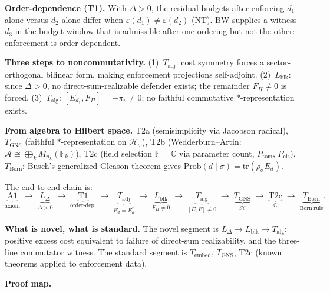 \documentclass[11pt]{article}
\theoremstyle{remark}
\begin{document}
\medskip
\noindent\textbf{Order-dependence (T1).}  With $\Delta > 0$, the residual budgets after enforcing $d_1$ alone versus $d_2$ alone differ when $\varepsilon(d_1) \ne \varepsilon(d_2)$ (NT).  BW supplies a witness $d_3$ in the budget window that is admissible after one ordering but not the other: enforcement is order-dependent.

\medskip
\noindent\textbf{Three steps to noncommutativity.}  (1)~$T_{\mathrm{adj}}$: cost symmetry forces a sector-orthogonal bilinear form, making enforcement projections self-adjoint.  (2)~$L_{\mathrm{blk}}$: since $\Delta > 0$, no direct-sum-realizable defender exists; the remainder $F_\Pi \ne 0$ is forced.  (3)~$T_{\mathrm{alg}}$: $[E_{d_1}, F_\Pi] = -\pi_v \ne 0$; no faithful commutative $*$-representation exists.

\medskip
\noindent\textbf{From algebra to Hilbert space.}  T2a (semisimplicity via Jacobson radical), $T_{\mathrm{GNS}}$ (faithful $*$-representation on $\mathcal{H}_\omega$), T2b (Wedderburn--Artin: $\mathcal{A} \cong \bigoplus_k M_{n_k}(\mathbb{F}_k)$), T2c (field selection $\mathbb{F} = \mathbb{C}$ via parameter count, $P_{\mathrm{tom}}$, $P_{\mathrm{cls}}$).  $T_{\mathrm{Born}}$: Busch's generalized Gleason theorem gives $\mathrm{Prob}(d \mid \sigma) = \mathrm{tr}(\rho_\sigma E_d)$.

\medskip
\noindent The end-to-end chain is:
\begin{equation}\label{eq:arg_chain}
\underbrace{\text{A1}}_{\text{axiom}} \;\to\;
\underbrace{L_\Delta}_{\Delta > 0} \;\to\;
\underbrace{\text{T1}}_{\text{order-dep.}} \;\to\;
\underbrace{T_{\mathrm{adj}}}_{E_d = E_d^\dagger} \;\to\;
\underbrace{L_{\mathrm{blk}}}_{F_\Pi \ne 0} \;\to\;
\underbrace{T_{\mathrm{alg}}}_{[E,F]\ne 0} \;\to\;
\underbrace{T_{\mathrm{GNS}}}_{\mathcal{H}} \;\to\;
\underbrace{\text{T2c}}_{\mathbb{C}} \;\to\;
\underbrace{T_{\mathrm{Born}}}_{\mathrm{Born\;rule}}.
\end{equation}

\medskip
\noindent\textbf{What is novel, what is standard.}  The novel segment is $L_\Delta \to L_{\mathrm{blk}} \to T_{\mathrm{alg}}$: positive excess cost equivalent to failure of direct-sum realizability, and the three-line commutator witness.  The standard segment is $T_{\mathrm{embed}}$, $T_{\mathrm{GNS}}$, T2c (known theorems applied to enforcement data).

\smallskip
\noindent\textbf{Proof map.}
\end{document}
